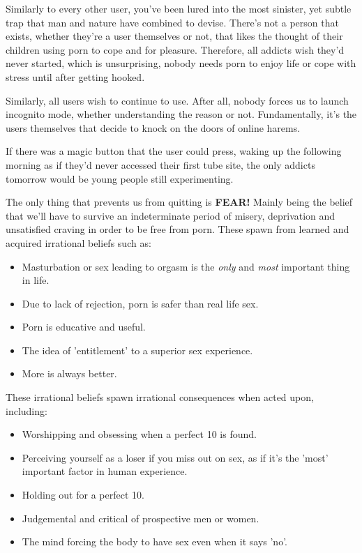 \documentclass[easypeasy.tex]{subfiles}
\begin{document}
Similarly to every other user, you've been lured into the most sinister, yet subtle trap that man and nature have combined to devise. There's not a person that exists, whether they're a user themselves or not, that likes the thought of their children using porn to cope and for pleasure. Therefore, all addicts wish they'd never started, which is unsurprising, nobody needs porn to enjoy life or cope with stress until after getting hooked.

Similarly, all users wish to continue to use. After all, nobody forces us to launch incognito mode, whether understanding the reason or not. Fundamentally, it's the users themselves that decide to knock on the doors of online harems.

If there was a magic button that the user could press, waking up the following morning as if they'd never accessed their first tube site, the only addicts tomorrow would be young people still experimenting.

The only thing that prevents us from quitting is \textbf{FEAR!} Mainly being the belief that we'll have to survive an indeterminate period of misery, deprivation and unsatisfied craving in order to be free from porn. These spawn from learned and acquired irrational beliefs such as:
    \begin{itemize}
      \item Masturbation or sex leading to orgasm is the \textit{only} and \textit{most} important thing in life.
      \item Due to lack of rejection, porn is safer than real life sex.
      \item Porn is educative and useful.
      \item The idea of 'entitlement' to a superior sex experience.
      \item More is always better.
    \end{itemize}
These irrational beliefs spawn irrational consequences when acted upon, including:
  \begin{itemize}
    \item Worshipping and obsessing when a perfect 10 is found.
    \item Perceiving yourself as a loser if you miss out on sex, as if it's the 'most' important factor in human experience.
    \item Holding out for a perfect 10.
    \item Judgemental and critical of prospective men or women.
    \item The mind forcing the body to have sex even when it says 'no'.
  \end{itemize}
\end{document}
